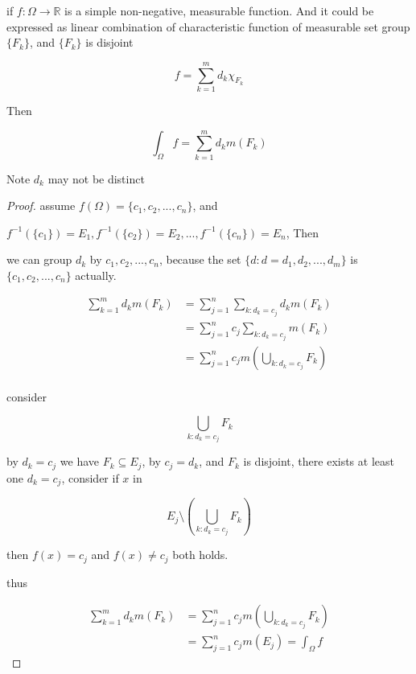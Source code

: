 \begin{thm}
    \label{thm:7e089ab3-04aa-44e3-9ead-32b28d6b95db}
    if $f: \Omega \to \mathbb{R}$ is a simple non-negative, measurable function. And it could be expressed as linear combination of characteristic function of measurable set group $\{ F_k\}$,
    and $\{ F_k\}$ is disjoint

    \[
        f = \sum_{k=1}^{m} d_k \chi_{F_k}
    \]

    Then

    \[
        \int_{\Omega} f = \sum_{k=1}^{m}d_k m(F_k)
    \]

    Note $d_k$ may not be distinct
\end{thm}

\begin{proof}
    assume $f(\Omega) = \{ c_1,c_2,...,c_n\}$, and 

    $f^{-1}(\{ c_1\}) = E_1, f^{-1}(\{ c_2\}) = E_2, ... , f^{-1}(\{ c_n\}) = E_n$, Then

    we can group $d_k$ by $c_1,c_2,...,c_n$, because the set $\{ d: d = d_1,d_2,...,d_m\} $ is $\{c_1,c_2,...,c_n\}$ actually.

    \begin{align*}
        \sum_{k=1}^{m}d_k m(F_k) &= \sum_{j=1}^{n}\sum_{k: d_k = c_j}d_k m(F_k) \\
        &= \sum_{j=1}^{n}c_j \sum_{k: d_k = c_j}m(F_k) \\
        &= \sum_{j=1}^{n}c_j m\left(\bigcup_{k: d_k = c_j} F_k \right) \\
    \end{align*}

    consider 

    \[
        \bigcup_{k: d_k = c_j} F_k
    \]

    by $d_k = c_j$ we have $F_k \subseteq E_j$, by $c_j = d_k$, and $F_k$ is disjoint, there exists at least one 
    $d_k = c_j$, consider if $x$ in

    \[
        E_j \setminus \left(\bigcup_{k: d_k = c_j} F_k \right)
    \]

    then $f(x) = c_j$ and $f(x) \ne c_j$ both holds.

    thus

    \begin{align*}
        \sum_{k=1}^{m}d_k m(F_k) &= \sum_{j=1}^{n}c_j m\left(\bigcup_{k: d_k = c_j} F_k \right) \\
        &= \sum_{j=1}^{n}c_j m\left(E_j \right) = \int_{\Omega} f
    \end{align*}

\end{proof}

